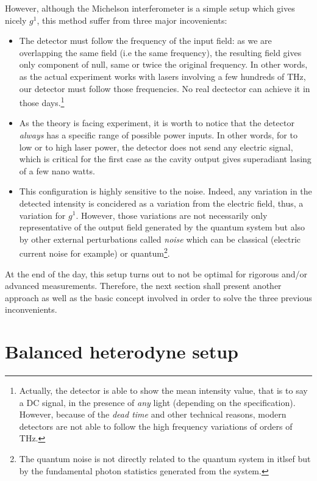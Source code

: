\documentclass[12pt]{report}
\begin{document}
However, although the Michelson interferometer is a simple setup which gives nicely $g^1$, this method suffer from three major incovenients:
\begin{itemize}
	\item The detector must follow the frequency of the input field: as we are overlapping the same field (i.e the same frequency), the resulting field gives only component of null, same or twice the original frequency. In other words, as the actual experiment works with lasers involving a few hundreds of THz, our detector must follow those frequencies. No real dectector can achieve it in those days.\footnote{Actually, the detector is able to show the mean intensity value, that is to say a DC signal, in the presence of \textit{any} light (depending on the specification). However, because of the \textit{dead time} and other technical reasons, modern detectors are not able to follow the high frequency variations of orders of THz.}
	\item As the theory is facing experiment, it is worth to notice that the detector \textit{always} has a specific range of possible power inputs. In other words, for to low or to high laser power, the detector does not send any electric signal, which is critical for the first case as the cavity output gives superadiant lasing of a few nano watts.
	\item This configuration is highly sensitive to the noise. Indeed, any variation in the detected intensity is concidered as a variation from the electric field, thus, a variation for $g^1$. However, those variations are not necessarily only representative of the output field generated by the quantum system but also by other external perturbations called \textit{noise} which can be classical (electric current noise for example) or quantum\footnote{The quantum noise is not directly related to the quantum system in itlsef but by the fundamental photon statistics generated from the system.}.
\end{itemize}

At the end of the day, this setup turns out to not be optimal for rigorous and/or advanced measurements. Therefore, the next section shall present another approach as well as the basic concept involved in order to solve the three previous inconvenients.

\section{Balanced heterodyne setup}
\paragraph{}
\end{document}
